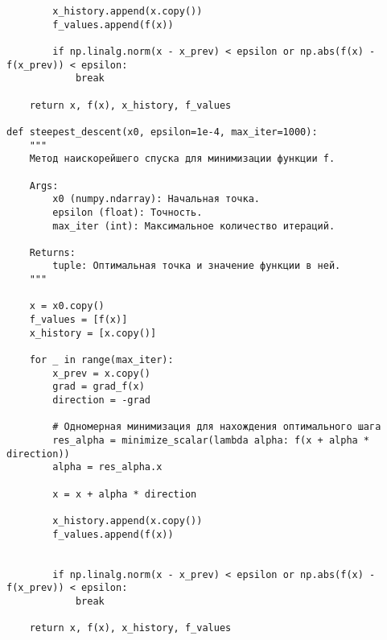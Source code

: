 \documentclass{article}
\begin{document}
\begin{lstlisting}
        x_history.append(x.copy())
        f_values.append(f(x))

        if np.linalg.norm(x - x_prev) < epsilon or np.abs(f(x) - f(x_prev)) < epsilon:
            break

    return x, f(x), x_history, f_values

def steepest_descent(x0, epsilon=1e-4, max_iter=1000):
    """
    Метод наискорейшего спуска для минимизации функции f.

    Args:
        x0 (numpy.ndarray): Начальная точка.
        epsilon (float): Точность.
        max_iter (int): Максимальное количество итераций.

    Returns:
        tuple: Оптимальная точка и значение функции в ней.
    """

    x = x0.copy()
    f_values = [f(x)]
    x_history = [x.copy()]

    for _ in range(max_iter):
        x_prev = x.copy()
        grad = grad_f(x)
        direction = -grad

        # Одномерная минимизация для нахождения оптимального шага
        res_alpha = minimize_scalar(lambda alpha: f(x + alpha * direction))
        alpha = res_alpha.x

        x = x + alpha * direction
        
        x_history.append(x.copy())
        f_values.append(f(x))


        if np.linalg.norm(x - x_prev) < epsilon or np.abs(f(x) - f(x_prev)) < epsilon:
            break

    return x, f(x), x_history, f_values

\end{lstlisting}
\end{document}
